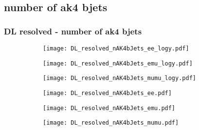 \documentclass[aspectratio=169,8pt]{beamer}
\begin{document}
\subsection{number of ak4 bjets}
\begin{frame}
\frametitle{DL resolved - number of ak4 bjets}
\begin{figure}
\captionsetup[subfigure]{labelformat=empty}
\begin{subfigure}{0.32\textwidth}
\texttt{[image: DL\_resolved\_nAK4bJets\_ee\_logy.pdf]}
\vspace*{-0.15cm}
\end{subfigure}
\hfil
\begin{subfigure}{0.32\textwidth}
\texttt{[image: DL\_resolved\_nAK4bJets\_emu\_logy.pdf]}
\vspace*{-0.15cm}
\end{subfigure}
\hfil
\begin{subfigure}{0.32\textwidth}
\texttt{[image: DL\_resolved\_nAK4bJets\_mumu\_logy.pdf]}
\vspace*{-0.15cm}
\end{subfigure}
\hfil
\begin{subfigure}{0.32\textwidth}
\texttt{[image: DL\_resolved\_nAK4bJets\_ee.pdf]}
\vspace*{-0.15cm}
\end{subfigure}
\hfil
\begin{subfigure}{0.32\textwidth}
\texttt{[image: DL\_resolved\_nAK4bJets\_emu.pdf]}
\vspace*{-0.15cm}
\end{subfigure}
\hfil
\begin{subfigure}{0.32\textwidth}
\texttt{[image: DL\_resolved\_nAK4bJets\_mumu.pdf]}
\vspace*{-0.15cm}
\end{subfigure}
\hfil
\end{figure}
\end{frame}
\newpage
\end{document}
